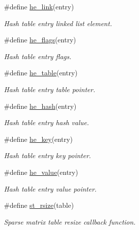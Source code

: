 \begin{CompactItemize}
\#define \hyperlink{group__dbprim__hash_a31}{he\_\-link}(entry)
\begin{CompactList}\small\item\em Hash table entry linked list element.\item\end{CompactList}\item 
\#define \hyperlink{group__dbprim__hash_a32}{he\_\-flags}(entry)
\begin{CompactList}\small\item\em Hash table entry flags.\item\end{CompactList}\item 
\#define \hyperlink{group__dbprim__hash_a33}{he\_\-table}(entry)
\begin{CompactList}\small\item\em Hash table entry table pointer.\item\end{CompactList}\item 
\#define \hyperlink{group__dbprim__hash_a34}{he\_\-hash}(entry)
\begin{CompactList}\small\item\em Hash table entry hash value.\item\end{CompactList}\item 
\#define \hyperlink{group__dbprim__hash_a35}{he\_\-key}(entry)
\begin{CompactList}\small\item\em Hash table entry key pointer.\item\end{CompactList}\item 
\#define \hyperlink{group__dbprim__hash_a36}{he\_\-value}(entry)
\begin{CompactList}\small\item\em Hash table entry value pointer.\item\end{CompactList}\item 
\#define \hyperlink{group__dbprim__hash_a37}{st\_\-rsize}(table)
\begin{CompactList}\small\item\em Sparse matrix table resize callback function.\item\end{CompactList}\end{CompactItemize}
